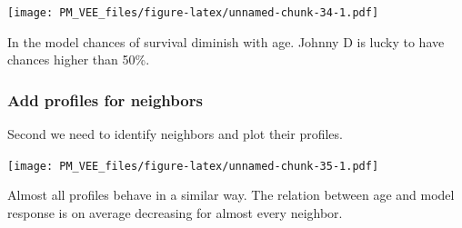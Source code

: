 \documentclass[12pt,]{krantz}
\newenvironment{Shaded}{\begin{snugshade}}{\end{snugshade}}
\newcommand{\DataTypeTok}[1]{\textcolor[rgb]{0.13,0.29,0.53}{#1}}
\newcommand{\DecValTok}[1]{\textcolor[rgb]{0.00,0.00,0.81}{#1}}
\newcommand{\KeywordTok}[1]{\textcolor[rgb]{0.13,0.29,0.53}{\textbf{#1}}}
\newcommand{\NormalTok}[1]{#1}
\newcommand{\OperatorTok}[1]{\textcolor[rgb]{0.81,0.36,0.00}{\textbf{#1}}}
\newcommand{\StringTok}[1]{\textcolor[rgb]{0.31,0.60,0.02}{#1}}
\theoremstyle{definition}
\theoremstyle{definition}
\theoremstyle{definition}
\theoremstyle{remark}
\begin{document}
\texttt{[image: PM\_VEE\_files/figure-latex/unnamed-chunk-34-1.pdf]}

In the model chances of survival diminish with age. Johnny D is lucky to
have chances higher than 50\%.

\hypertarget{add-profiles-for-neighbors}{%
\subsubsection{Add profiles for
neighbors}\label{add-profiles-for-neighbors}}

Second we need to identify neighbors and plot their profiles.

\begin{Shaded}
\end{Shaded}

\texttt{[image: PM\_VEE\_files/figure-latex/unnamed-chunk-35-1.pdf]}

Almost all profiles behave in a similar way. The relation between age
and model response is on average decreasing for almost every neighbor.
\end{document}
